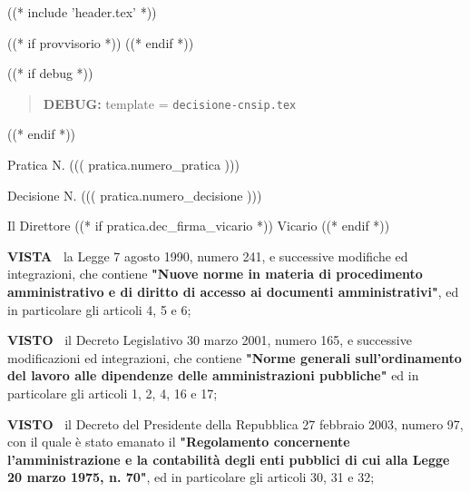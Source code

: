 
((* include 'header.tex' *))

((* if provvisorio *))
((* endif *))


\topaddr

((* if debug *))
\begin{quotation}
	\textbf{DEBUG:} template = \texttt{decisione-cnsip.tex}
\end{quotation}
((* endif *))

Pratica N. ((( pratica.numero_pratica )))

\begin{flushright}
Decisione N. ((( pratica.numero_decisione )))
\end{flushright}

\begin{center}

Il Direttore ((* if pratica.dec_firma_vicario *)) Vicario ((* endif *))

\end{center}
\textbf{VISTA~}	la Legge 7 agosto 1990, numero 241, e successive modifiche
ed integrazioni, che contiene \textbf{"Nuove norme in materia di procedimento
amministrativo e di diritto di accesso ai documenti amministrativi"},
ed in particolare gli articoli 4, 5 e 6;

\textbf{VISTO~}	il Decreto Legislativo 30 marzo 2001, numero 165, e
successive modificazioni ed integrazioni, che contiene \textbf{"Norme generali
sull'ordinamento del lavoro alle dipendenze delle amministrazioni
pubbliche"} ed in particolare gli articoli 1, 2, 4, 16 e 17;

\textbf{VISTO~}	il Decreto del Presidente della Repubblica 27 febbraio
2003, numero 97, con il quale è stato emanato il \textbf{"Regolamento concernente
l'amministrazione e la contabilità degli enti pubblici di cui alla
Legge 20 marzo 1975, n. 70"}, ed in particolare gli articoli 30, 31 e 32;

